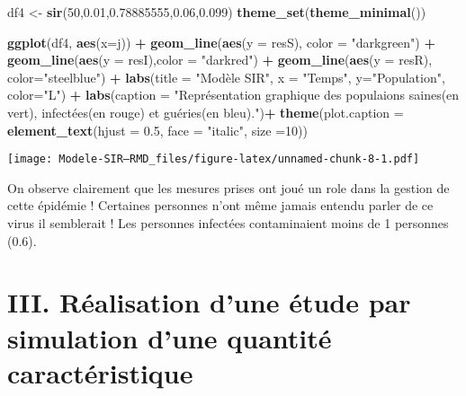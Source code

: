 \documentclass[
]{article}
\newenvironment{Shaded}{\begin{snugshade}}{\end{snugshade}}
\newcommand{\DataTypeTok}[1]{\textcolor[rgb]{0.13,0.29,0.53}{#1}}
\newcommand{\DecValTok}[1]{\textcolor[rgb]{0.00,0.00,0.81}{#1}}
\newcommand{\FloatTok}[1]{\textcolor[rgb]{0.00,0.00,0.81}{#1}}
\newcommand{\KeywordTok}[1]{\textcolor[rgb]{0.13,0.29,0.53}{\textbf{#1}}}
\newcommand{\NormalTok}[1]{#1}
\newcommand{\OperatorTok}[1]{\textcolor[rgb]{0.81,0.36,0.00}{\textbf{#1}}}
\newcommand{\StringTok}[1]{\textcolor[rgb]{0.31,0.60,0.02}{#1}}
\begin{document}
\begin{Shaded}
\begin{Highlighting}[]
\NormalTok{df4 <-}\StringTok{ }\KeywordTok{sir}\NormalTok{(}\DecValTok{50}\NormalTok{,}\FloatTok{0.01}\NormalTok{,}\FloatTok{0.78885555}\NormalTok{,}\FloatTok{0.06}\NormalTok{,}\FloatTok{0.099}\NormalTok{)}
\KeywordTok{theme_set}\NormalTok{(}\KeywordTok{theme_minimal}\NormalTok{())}

\KeywordTok{ggplot}\NormalTok{(df4, }\KeywordTok{aes}\NormalTok{(}\DataTypeTok{x=}\NormalTok{j)) }\OperatorTok{+}\StringTok{ }\KeywordTok{geom_line}\NormalTok{(}\KeywordTok{aes}\NormalTok{(}\DataTypeTok{y =}\NormalTok{ resS), }\DataTypeTok{color =} \StringTok{"darkgreen"}\NormalTok{) }\OperatorTok{+}\StringTok{ }\KeywordTok{geom_line}\NormalTok{(}\KeywordTok{aes}\NormalTok{(}\DataTypeTok{y =}\NormalTok{ resI),}\DataTypeTok{color =} \StringTok{"darkred"}\NormalTok{) }\OperatorTok{+}\StringTok{ }\KeywordTok{geom_line}\NormalTok{(}\KeywordTok{aes}\NormalTok{(}\DataTypeTok{y =}\NormalTok{ resR), }\DataTypeTok{color=}\StringTok{"steelblue"}\NormalTok{) }\OperatorTok{+}\StringTok{ }\KeywordTok{labs}\NormalTok{(}\DataTypeTok{title =} \StringTok{"Modèle SIR"}\NormalTok{, }\DataTypeTok{x =} \StringTok{"Temps"}\NormalTok{, }\DataTypeTok{y=}\StringTok{"Population"}\NormalTok{, }\DataTypeTok{color=}\StringTok{"L"}\NormalTok{) }\OperatorTok{+}\StringTok{ }\KeywordTok{labs}\NormalTok{(}\DataTypeTok{caption =} \StringTok{"Représentation graphique des populaions saines(en vert), infectées(en rouge) et guéries(en bleu)."}\NormalTok{)}\OperatorTok{+}\StringTok{ }\KeywordTok{theme}\NormalTok{(}\DataTypeTok{plot.caption =} \KeywordTok{element_text}\NormalTok{(}\DataTypeTok{hjust =} \FloatTok{0.5}\NormalTok{, }\DataTypeTok{face =} \StringTok{"italic"}\NormalTok{, }\DataTypeTok{size =}\DecValTok{10}\NormalTok{)) }
\end{Highlighting}
\end{Shaded}

\texttt{[image: Modele-SIR---RMD\_files/figure-latex/unnamed-chunk-8-1.pdf]}

On observe clairement que les mesures prises ont joué un role dans la
gestion de cette épidémie ! Certaines personnes n'ont même jamais
entendu parler de ce virus il semblerait ! Les personnes infectées
contaminaient moins de 1 personnes (0.6).

\hypertarget{iii.-ruxe9alisation-dune-uxe9tude-par-simulation-dune-quantituxe9-caractuxe9ristique}{%
\section{III. Réalisation d'une étude par simulation d'une quantité
caractéristique}\label{iii.-ruxe9alisation-dune-uxe9tude-par-simulation-dune-quantituxe9-caractuxe9ristique}}
\end{document}
